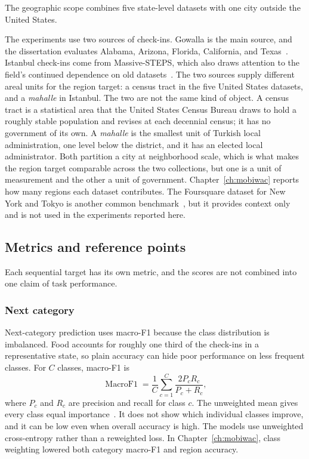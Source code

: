 The geographic scope combines five state-level datasets with one city outside the
United States.

The experiments use two sources of check-ins. Gowalla is the main source, and the
dissertation evaluates Alabama, Arizona, Florida, California, and
Texas~\cite{cho2011gowalla}. Istanbul check-ins come from Massive-STEPS, which also
draws attention to the field's continued dependence on old
datasets~\cite{wongso2025massivesteps}. The two sources supply different areal units
for the region target: a census tract in the five United States datasets, and a
\emph{mahalle} in Istanbul. The two are not the same kind of object. A census tract is a
statistical area that the United States Census Bureau draws to hold a roughly stable
population and revises at each decennial census; it has no government of its own. A
\emph{mahalle} is the smallest unit of Turkish local administration, one level below
the district, and it has an elected local administrator. Both partition a city at
neighborhood scale, which is what makes the region target comparable across the two
collections, but one is a unit of measurement and the other a unit of government.
Chapter~\ref{ch:mobiwac} reports how many regions each dataset contributes. The Foursquare dataset for New
York and Tokyo
is another common benchmark~\cite{yang2015tsmc}, but it provides context only and is
not used in the experiments reported here.

\subsection{Metrics and reference points}

Each sequential target has its own metric, and the scores are not combined into one
claim of task performance.

\subsubsection{Next category}

Next-category prediction uses macro-F1 because the class distribution is imbalanced.
Food accounts for roughly one third of the check-ins in a representative state, so
plain accuracy can hide poor performance on less frequent classes. For $C$ classes,
macro-F1 is
\begin{equation}\label{eq:fund:macro-f1}
    \operatorname{MacroF1} = \frac{1}{C}\sum_{c=1}^{C}
    \frac{2P_cR_c}{P_c+R_c},
\end{equation}
where $P_c$ and $R_c$ are precision and recall for class $c$. The unweighted mean
gives every class equal importance~\cite{sokolova2009measures}. It does not show which
individual classes improve, and it can be low even when overall accuracy is high. The
models use unweighted cross-entropy rather than a reweighted loss. In
Chapter~\ref{ch:mobiwac}, class weighting lowered both category macro-F1 and region
accuracy.

